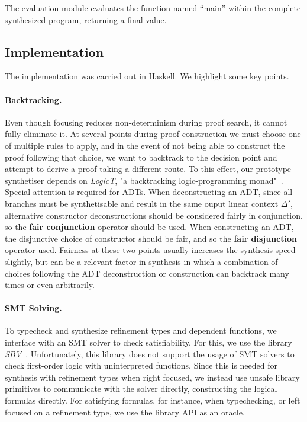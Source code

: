 \documentclass{llncs}
\newcommand{\mypara}[1]{\paragraph{\textbf{#1}.}}
\begin{document}
The evaluation module evaluates the function named ``main'' within the
complete synthesized program, returning a final value.




\subsection{Implementation}

The implementation was carried out in Haskell. We
highlight some key points.

\mypara{Backtracking} Even though focusing reduces non-determinism
during proof search, it cannot fully eliminate it. At several points
during proof construction we must choose one of multiple rules to
apply, and in the event of not being able to construct the proof
following that choice, we want to backtrack to the decision point and
attempt to derive a proof taking a different route. To this effect,
our prototype synthetiser depends on \emph{LogicT}, "a backtracking
logic-programming monad"~\cite{logict}. Special attention is
required for ADTs. When deconstructing an ADT, since all branches must be
synthetisable and result in the same ouput linear context $\Delta'$, alternative
constructor deconstructions should be considered fairly in conjunction, so the
\textbf{fair conjunction} operator should be used. When constructing an ADT, the
disjunctive choice of constructor should be fair, and so the \textbf{fair
disjunction} operator used. Fairness at these two points usually increases
the synthesis speed slightly, but can be a relevant factor in synthesis in which a
combination of choices following the ADT deconstruction or construction can
backtrack many times or even arbitrarily.

\mypara{SMT Solving} To typecheck and synthesize refinement types and
dependent functions, we interface with an SMT solver to check
satisfiability. For this, we use the library
\emph{SBV}~\cite{sbv}. Unfortunately, this library does not support
the usage of SMT solvers to check first-order logic with uninterpreted
functions. Since this is needed for synthesis with refinement types
when right focused, we instead use unsafe library primitives to
communicate with the solver directly, constructing the logical
formulas directly. For satisfying formulas, for instance, when
typechecking, or left focused on a refinement type, we use the library
API as an oracle.
\end{document}
